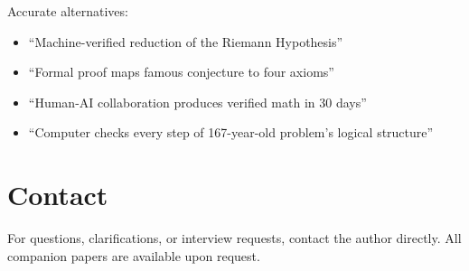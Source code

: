 \documentclass[11pt,a4paper]{article}
\begin{document}
Accurate alternatives:

\begin{itemize}
  \item ``Machine-verified reduction of the Riemann Hypothesis''
  \item ``Formal proof maps famous conjecture to four axioms''
  \item ``Human-AI collaboration produces verified math in 30 days''
  \item ``Computer checks every step of 167-year-old problem's
    logical structure''
\end{itemize}

\section{Contact}

For questions, clarifications, or interview requests, contact
the author directly. All companion papers are available upon
request.
\end{document}
